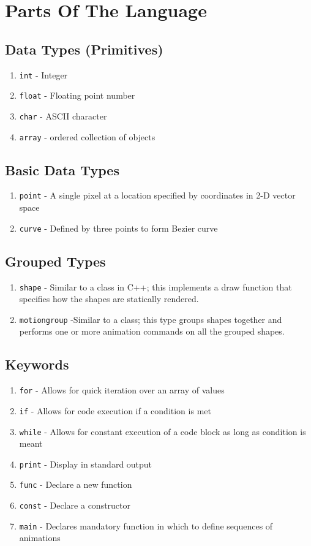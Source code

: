 \documentclass[letterpaper,12pt]{article}
\begin{document}
\section*{Parts Of The Language}

\subsection*{Data Types (Primitives)}
\begin{enumerate}
\itemsep0em
\item \texttt{int} - Integer
\item \texttt{float} - Floating point number
\item \texttt{char} - ASCII character
\item \texttt{array} - ordered collection of objects
\end{enumerate}

\subsection*{Basic Data Types}
\begin{enumerate}
\itemsep0em
\item \texttt{point} - A single pixel at a location specified by coordinates in 2-D vector space
\item \texttt{curve} - Defined by three points to form Bezier curve
\end{enumerate}


\subsection*{Grouped Types}
\begin{enumerate}
\item \texttt{shape} - Similar to a class in C++; this implements a draw function that specifies how the shapes are statically rendered.
\item \texttt{motiongroup} -Similar to a class; this type groups shapes together and performs one or more animation commands on all the grouped shapes.
\end{enumerate}

\subsection*{Keywords}
\begin{enumerate}
\itemsep0em
\item \texttt{for} - Allows for quick iteration over an array of values
\item \texttt{if} - Allows for code execution if a condition is met 
\item \texttt{while} - Allows for constant execution of a code block as long as condition is meant 
\item \texttt{print} - Display in standard output
\item \texttt{func} - Declare a new function
\item \texttt{const} - Declare a constructor 
\item \texttt{main} - Declares mandatory function in which to define sequences of animations
\end{enumerate}
\end{document}

